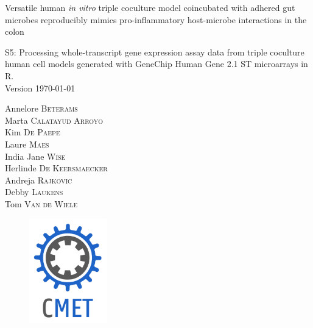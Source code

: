 \begin{titlepage}


\fontsize{12pt}{14pt}
\selectfont

\begin{center}


\vspace{0.4cm}
\fontsize{30pt}{30pt}\selectfont
Versatile human \emph{in vitro} triple coculture model coincubated with adhered gut microbes reproducibly mimics pro-inflammatory host-microbe interactions in the colon\\
\vspace{2cm}

\fontsize{20pt}{14pt}\selectfont
S5: Processing whole-transcript gene expression assay data from triple coculture human cell models generated with GeneChip Human Gene 2.1 ST microarrays in R.\\

\vspace{1cm}
\fontsize{14pt}{14pt}\selectfont
Version \today
\vspace{0.4cm}

\fontsize{14pt}{14pt}\selectfont
Annelore \textsc{Beterams}\\ 
Marta \textsc{Calatayud Arroyo}\\
Kim \textsc{De Paepe}\\
Laure \textsc{Maes}\\
India Jane \textsc{Wise}\\
Herlinde \textsc{De Keersmaecker}\\
Andreja \textsc{Rajkovic}\\
Debby \textsc{Laukens}\\
Tom \textsc{Van de Wiele}\\


\begin{figure}
\centering
\includegraphics[width=0.3\textwidth]{CMET_default.png}
\end{figure}

\end{center}
\end{titlepage}

\thispagestyle{empty}